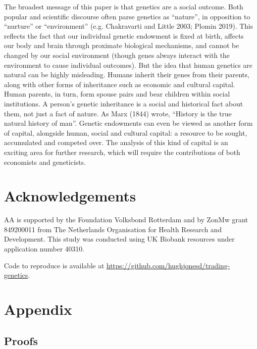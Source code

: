 \documentclass[
]{article}
\theoremstyle{definition}
\theoremstyle{definition}
\theoremstyle{definition}
\theoremstyle{definition}
\theoremstyle{remark}
\begin{document}
The broadest message of this paper is that genetics are a social
outcome. Both popular and scientific discourse often parse genetics as
``nature'', in opposition to ``nurture'' or ``environment'' (e.g. Chakravarti and Little 2003; Plomin 2019). This reflects the fact that
our individual genetic endowment is fixed at birth, affects our body and brain
through proximate biological mechanisms, and cannot be changed by our social
environment (though genes always interact with the environment to cause
individual outcomes). But the idea that human genetics are natural can be highly
misleading. Humans inherit their genes from their parents, along with other
forms of inheritance such as economic and cultural capital. Human parents, in
turn, form spouse pairs and bear children within social institutions. A person's
genetic inheritance is a social and historical fact about them, not just a
fact of nature. As Marx (1844) wrote, ``History is the true natural history of
man''. Genetic endowments can even be viewed as another form of capital,
alongside human, social and cultural capital: a resource to be sought,
accumulated and competed over. The analysis of this kind of capital is an
exciting area for further research, which will require the contributions of both
economists and geneticists.

\hypertarget{acknowledgements}{%
\section{Acknowledgements}\label{acknowledgements}}

AA is supported by the Foundation Volksbond Rotterdam and by ZonMw grant
849200011 from The Netherlands Organisation for Health Research and Development.
This study was conducted using UK Biobank resources under application number
40310.

Code to reproduce is available at \url{https://github.com/hughjonesd/trading-genetics}.

\FloatBarrier

\newpage

\hypertarget{appendix}{%
\section{Appendix}\label{appendix}}

\localtableofcontents
\clearpage

\hypertarget{proofs}{%
\subsection{Proofs}\label{proofs}}
\end{document}
